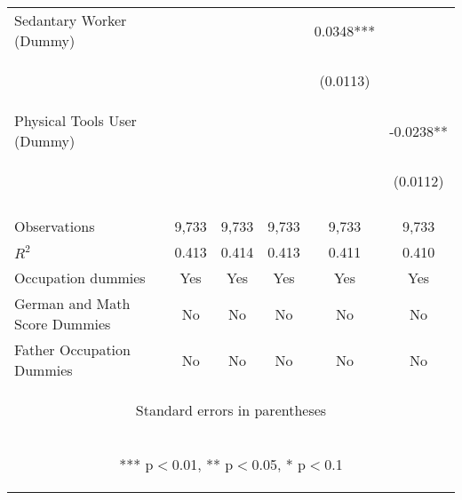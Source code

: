 \begin{center}
\begin{tabular}{lccccc}
Sedantary Worker (Dummy) &  &  &  & 0.0348*** &  \\
\vspace{4pt} & \begin{footnotesize}\end{footnotesize} & \begin{footnotesize}\end{footnotesize} & \begin{footnotesize}\end{footnotesize} & \begin{footnotesize}(0.0113)\end{footnotesize} & \begin{footnotesize}\end{footnotesize} \\
Physical Tools User (Dummy) &  &  &  &  & -0.0238** \\
 & \begin{footnotesize}\end{footnotesize} & \begin{footnotesize}\end{footnotesize} & \begin{footnotesize}\end{footnotesize} & \begin{footnotesize}\end{footnotesize} & \begin{footnotesize}(0.0112)\end{footnotesize} \\
\vspace{4pt} & \begin{footnotesize}\end{footnotesize} & \begin{footnotesize}\end{footnotesize} & \begin{footnotesize}\end{footnotesize} & \begin{footnotesize}\end{footnotesize} & \begin{footnotesize}\end{footnotesize} \\
Observations & 9,733 & 9,733 & 9,733 & 9,733 & 9,733 \\
$R^2$ & 0.413 & 0.414 & 0.413 & 0.411 & 0.410 \\
Occupation dummies & Yes & Yes & Yes & Yes & Yes \\
German and Math Score Dummies & No & No & No & No & No \\
 Father Occupation Dummies & No & No & No & No & No \\ \hline
\multicolumn{6}{c}{\begin{footnotesize} Standard errors in parentheses\end{footnotesize}} \\
\multicolumn{6}{c}{\begin{footnotesize} *** p$<$0.01, ** p$<$0.05, * p$<$0.1\end{footnotesize}} \\
\end{tabular}
\end{center}
